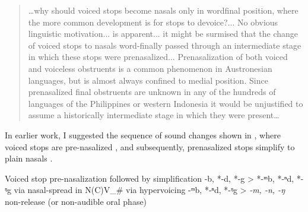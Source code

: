 \documentclass[output=paper]{langscibook}
\begin{document}
\begin{quote}
…why should voiced stops become nasals only in wordfinal position, where the more common development is for stops to devoice?... No obvious linguistic motivation... is apparent... it might be surmised that the change of voiced stops to nasals word-finally passed through an intermediate stage in which these stops were prenasalized... Prenasalization of both voiced and voiceless obstruents is a common phenomenon in Austronesian languages, but is almost always confined to medial position. Since prenasalized final obstruents are unknown in any of the hundreds of languages of the Philippines or western Indonesia it would be unjustified to assume a historically intermediate stage in which they were present…
\end{quote}

In earlier work, I suggested the sequence of sound changes shown in , where voiced stops are pre-nasalized , and subsequently, prenasalized stops simplify to plain nasals  \citep{Blevins2007}.

\ea%
    \label{ex:blevins:7}Voiced stop pre-nasalization followed by simplification
\ea *-b, *-d, *-g   >   *-ᵐb, *-ⁿd, *-ᵑg\label{ex:blevins:7i}
\ea via nasal-spread in N(C)V\_\#
\ex via hypervoicing
\z
\ex   *-ᵐb, *-ⁿd, *-ᵑg >  \textit{-m, -n, -ŋ}  \\
      non-release (or non-audible oral phase)\label{ex:blevins:7ii}
\z
\z
\end{document}
